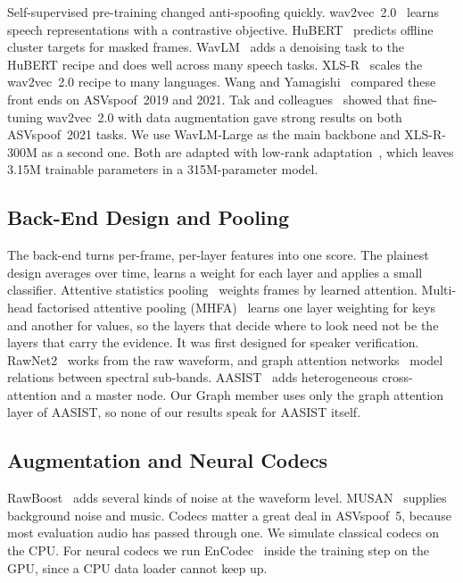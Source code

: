 \documentclass[twocolumn,a4paper,11pt]{article}
\begin{document}
Self-supervised pre-training changed anti-spoofing quickly. wav2vec~2.0~\cite{wav2vec2}
learns speech representations with a contrastive objective. HuBERT~\cite{hubert}
predicts offline cluster targets for masked frames. WavLM~\cite{wavlm} adds a
denoising task to the HuBERT recipe and does well across many speech tasks.
XLS-R~\cite{xlsr} scales the wav2vec~2.0 recipe to many languages. Wang and
Yamagishi~\cite{wang2021ssl} compared these front ends on ASVspoof~2019 and
2021. Tak and colleagues~\cite{tak2022wav2vec} showed that fine-tuning
wav2vec~2.0 with data augmentation gave strong results on both ASVspoof~2021
tasks. We use WavLM-Large as the main backbone and XLS-R-300M as a second one.
Both are adapted with low-rank adaptation~\cite{lora}, which leaves 3.15M
trainable parameters in a 315M-parameter model.

\subsection{Back-End Design and Pooling}

The back-end turns per-frame, per-layer features into one score. The plainest
design averages over time, learns a weight for each layer and applies a small
classifier. Attentive statistics pooling~\cite{attentive_pool} weights frames
by learned attention. Multi-head factorised attentive pooling
(MHFA)~\cite{mhfa} learns one layer weighting for keys and another for values,
so the layers that decide where to look need not be the layers that carry the
evidence. It was first designed for speaker verification. RawNet2~\cite{rawnet2}
works from the raw waveform, and graph attention networks~\cite{gat_spoof}
model relations between spectral sub-bands. AASIST~\cite{aasist} adds
heterogeneous cross-attention and a master node. Our Graph member uses only the
graph attention layer of AASIST, so none of our results speak for AASIST itself.

\subsection{Augmentation and Neural Codecs}

RawBoost~\cite{rawboost} adds several kinds of noise at the waveform level.
MUSAN~\cite{musan} supplies background noise and music. Codecs matter a great
deal in ASVspoof~5, because most evaluation audio has passed through one. We
simulate classical codecs on the CPU. For neural codecs we run EnCodec~\cite{encodec}
inside the training step on the GPU, since a CPU data loader cannot keep up.
\end{document}
